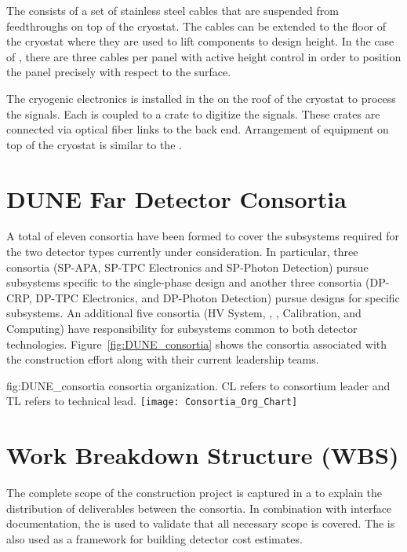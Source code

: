 The   consists of a set of stainless steel
cables that are suspended from feedthroughs on top of the
cryostat. The cables can be extended to the floor of the cryostat where
they are used to lift components to design height. In the case of
, there are three cables per panel with active height
control in order to position the panel precisely with respect to the
 surface.

The cryogenic  electronics is installed in the
 on the roof of the cryostat to process the
 signals. Each  is coupled to a 
crate to digitize the signals. These crates are connected via optical
fiber links to the  back end. Arrangement of equipment on
top of the cryostat is similar to the .

\section{DUNE Far Detector Consortia}
\label{sec:fdconsortia}

A total of eleven  consortia have been formed to cover 
the subsystems required for the two detector types currently under
consideration.  In particular, three consortia (SP-APA, SP-TPC
Electronics and SP-Photon Detection) pursue subsystems specific to
the single-phase design and another three consortia (DP-CRP, DP-TPC
Electronics, and DP-Photon Detection) pursue designs for 
specific subsystems.  An additional five consortia (HV System, ,
, Calibration, and Computing)
have responsibility for subsystems common to both detector
technologies.  Figure~\ref{fig:DUNE_consortia} shows the consortia 
associated with the  construction effort along with their 
current leadership teams.  
\begin{dunefigure}{fig:DUNE_consortia}
  { consortia organization. CL refers to consortium leader
    and TL refers to technical lead.}
  \texttt{[image: Consortia\_Org\_Chart]}
\end{dunefigure}

\section{Work Breakdown Structure (WBS)}
\label{sec:fdsp-coord-wbs}

The complete scope of the  construction project is captured in a 
 to explain the distribution of deliverables between 
the consortia.  In combination with interface documentation, the 
 is used to validate that all necessary scope is covered.  The 
 is also used as a framework for building  
detector cost estimates.

